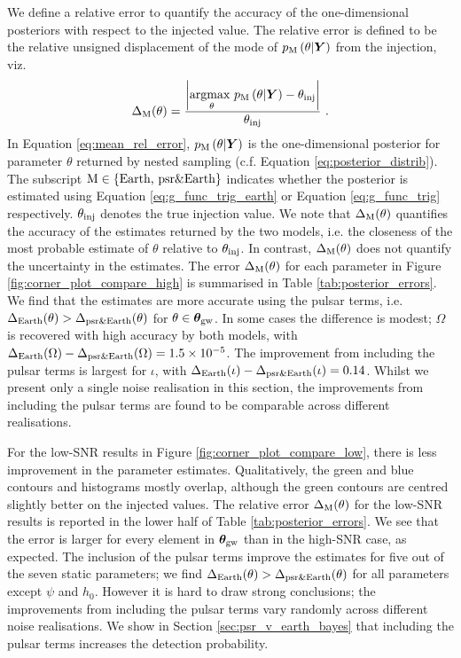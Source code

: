 \documentclass[fleqn,usenatbib,useAMS]{mnras}
\begin{document}
We define a relative error to quantify the accuracy of the one-dimensional posteriors with respect to the injected value. The relative error is defined to be the relative unsigned displacement of the mode of $p_{\rm M}\left(\theta| \boldsymbol{Y}\right)$ from the injection, viz.
\begin{eqnarray}
\Delta_{\rm M}(\theta) = \frac{ \left| \underset{\theta}{\text{argmax }} p_{\rm M}\left(\theta| \boldsymbol{Y}\right) - \theta_{\rm inj}\right|}{\theta_{\rm inj}} \ . \label{eq:mean_rel_error}
\end{eqnarray}
In Equation \eqref{eq:mean_rel_error}, $p_{\rm M}\left(\theta| \boldsymbol{Y}\right)$ is the one-dimensional posterior for parameter $\theta$ returned by nested sampling (c.f. Equation \eqref{eq:posterior_distrib}). The subscript $\rm M \in \{ \text{Earth, psr\&Earth} \}$ indicates whether the posterior is estimated using Equation \eqref{eq:g_func_trig_earth} or Equation \eqref{eq:g_func_trig} respectively. $\theta_{\rm inj}$ denotes the true injection value. We note that $\Delta_{\rm M}(\theta)$ quantifies the accuracy of the estimates returned by the two models, i.e. the closeness of the most probable estimate of $\theta$ relative to $\theta_{\rm inj}$. In contrast, $\Delta_{\rm M}(\theta)$ does not quantify the uncertainty in the estimates. The error $\Delta_{\rm M}(\theta)$ for each parameter in Figure \ref{fig:corner_plot_compare_high} is summarised in Table \ref{tab:posterior_errors}. We find that the estimates are more accurate using the pulsar terms, i.e. $\Delta_{\rm Earth}(\theta) > \Delta_{\rm psr \& Earth}(\theta)$ for $\theta \in \boldsymbol{\theta}_{\rm gw}$. In some cases the difference is modest;  $\Omega$ is recovered with high accuracy by both models, with $\Delta_{\rm Earth}(\Omega)-\Delta_{\rm psr \& Earth}(\Omega) = 1.5 \times 10^{-5}$. The improvement from including the pulsar terms is largest for $\iota$, with $\Delta_{\rm Earth}(\iota) - \Delta_{\rm psr \& Earth}(\iota)  = 0.14$. Whilst we present only a single noise realisation in this section, the improvements from including the pulsar terms are found to be comparable across different realisations. \newline 


For the low-SNR results in Figure \ref{fig:corner_plot_compare_low}, there is less improvement in the parameter estimates. Qualitatively, the green and blue contours and histograms mostly overlap, although the green contours are centred slightly better on the injected values. The relative error $\Delta_{\rm M}(\theta)$ for the low-SNR results is reported in the lower half of Table \ref{tab:posterior_errors}. We see that the error is larger for every element in $\boldsymbol{\theta}_{\rm gw}$ than in the high-SNR case, as expected. The inclusion of the pulsar terms improve the estimates for five out of the seven static parameters; we find $\Delta_{\rm Earth}(\theta) > \Delta_{\rm psr \& Earth}(\theta)$ for all parameters except $\psi$ and $h_0$. However it is hard to draw strong conclusions; the improvements from including the pulsar terms vary randomly across different noise realisations. We show in Section \ref{sec:psr_v_earth_bayes} that including the pulsar terms increases the detection probability. \newline 
\end{document}
